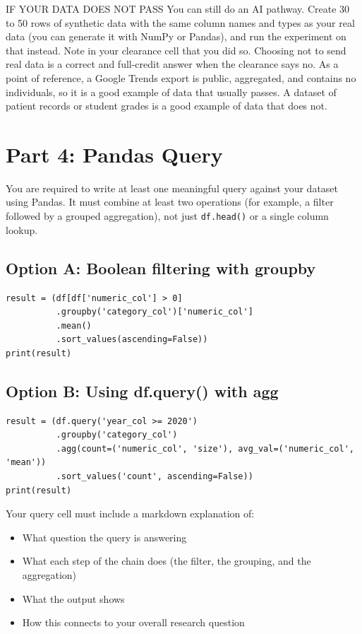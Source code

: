 \documentclass[11pt,letterpaper]{article}
\newcommand{\code}[1]{\texttt{#1}}
\begin{document}
\begin{callout}{IF YOUR DATA DOES NOT PASS}
You can still do an AI pathway. Create 30 to 50 rows of synthetic data with the same column names and types as your real data (you can generate it with NumPy or Pandas), and run the experiment on that instead. Note in your clearance cell that you did so. Choosing not to send real data is a correct and full-credit answer when the clearance says no. As a point of reference, a Google Trends export is public, aggregated, and contains no individuals, so it is a good example of data that usually passes. A dataset of patient records or student grades is a good example of data that does not.
\end{callout}

\section{Part 4: Pandas Query}

You are required to write at least one meaningful query against your dataset using Pandas. It must combine at least two operations (for example, a filter followed by a grouped aggregation), not just \code{df.head()} or a single column lookup.

\subsection{Option A: Boolean filtering with groupby}
\begin{lstlisting}
result = (df[df['numeric_col'] > 0]
          .groupby('category_col')['numeric_col']
          .mean()
          .sort_values(ascending=False))
print(result)
\end{lstlisting}

\subsection{Option B: Using df.query() with agg}
\begin{lstlisting}
result = (df.query('year_col >= 2020')
          .groupby('category_col')
          .agg(count=('numeric_col', 'size'), avg_val=('numeric_col', 'mean'))
          .sort_values('count', ascending=False))
print(result)
\end{lstlisting}

Your query cell must include a markdown explanation of:
\begin{itemize}
  \item What question the query is answering
  \item What each step of the chain does (the filter, the grouping, and the aggregation)
  \item What the output shows
  \item How this connects to your overall research question
\end{itemize}
\end{document}
